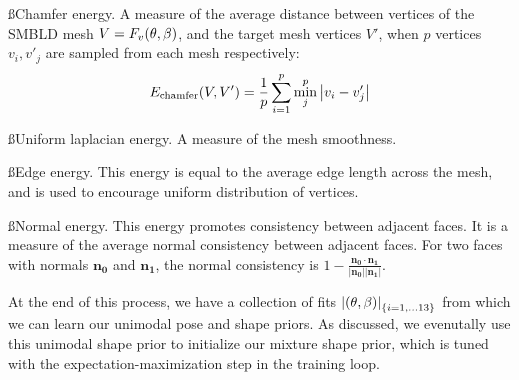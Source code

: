 \ss{Chamfer energy.} A measure of the average distance between vertices of the SMBLD mesh $V=F_v(\theta, \beta)$, and the target mesh vertices $V'$, when $p$ vertices $v_{i}, v'_{j}$ are sampled from each mesh respectively:
\begin{equation}
        E_\textrm{chamfer}(V, V') = \frac{1}{p} \sum_{i=1}^p \min_j^p  \left | v_{i} - v'_{j} \right |
\end{equation}

\ss{Uniform laplacian energy.} A measure of the mesh smoothness.

\ss{Edge energy.} This energy is equal to the average edge length across the mesh, and is used to encourage uniform distribution of vertices.

\ss{Normal energy.} This energy promotes consistency between adjacent faces. It is a measure of the average normal consistency between adjacent faces. For two faces with normals $\mathbf{n_0}$ and $\mathbf{n_1}$, the normal consistency is $1 - \frac{\mathbf{n_0} \cdot \mathbf{n_1}}{\left|\mathbf{n_0}\right|\left|\mathbf{n_1}\right|}$.

At the end of this process, we have a collection of fits $\left|(\theta,\beta)\right|_{\{i=1,...13\}}$ from which we can learn our unimodal pose and shape priors. As discussed, we evenutally use this unimodal shape prior to initialize our mixture shape prior, which is tuned with the expectation-maximization step in the training loop.



